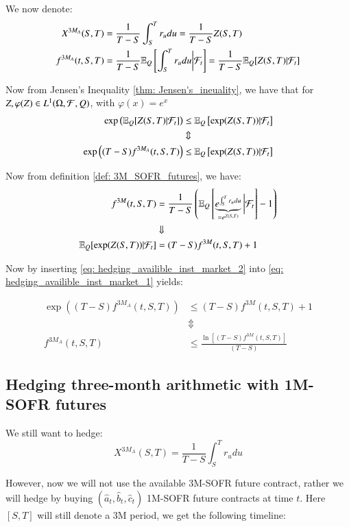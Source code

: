 We now denote: 
\begin{align*}
X^{3M_{A}}(S,T) &= \frac{1}{T-S}\int_{S}^{T}r_{u}du = \frac{1}{T-S}Z(S,T) \\ 
f^{3M_{A}}(t,S,T) &= \frac{1}{T-S}\mathbb{E}_{Q}\left[
\int_{S}^{T}r_{u}du\bigg{|}\mathcal{F}_{t}
\right] = \frac{1}{T-S}\mathbb{E}_{Q}[Z(S,T)|\mathcal{F}_{t}]
\end{align*}

Now from Jensen's Inequality \ref{thm: Jensen's_ineuality}, we have that for $Z, \varphi(Z) \in L^{1}(\Omega, \mathcal{F}, Q)$, with $\varphi(x) = e^{x}$
\begin{align}
\label{eq: hedging_availible_inst_market_1}
\exp\left(
\mathbb{E}_{Q}[Z(S,T)|\mathcal{F}_{t}]
\right)
&\leq 
\mathbb{E}_{Q}\left[
\exp(Z(S,T))|\mathcal{F}_{t}
\right] \nonumber \\ 
&\Updownarrow \nonumber \\ 
\exp\left(
(T-S)f^{3M_{A}}(t,S,T)
\right) 
&\leq 
\mathbb{E}_{Q}\left[\exp(Z(S,T))|\mathcal{F}_{t}\right]
\end{align} 

Now from definition \ref{def: 3M_SOFR_futures}, we have: 
\begin{align}
\label{eq: hedging_availible_inst_market_2}
f^{3M}(t,S,T) &= \frac{1}{T-S}\left(
\mathbb{E}_{Q}\left[
\underbrace{e^{\int_{S}^{T}r_{u}du}}_{=e^{Z(S,T)}}
\bigg{|}\mathcal{F}_{t}\right] - 1
\right) \nonumber \\ 
&\Downarrow \nonumber \\ 
\mathbb{E}_{Q}[\exp(Z(S,T))|\mathcal{F}_{t}] &= (T-S)f^{3M}(t,S,T) + 1
\end{align}

Now by inserting \ref{eq: hedging_availible_inst_market_2} into \ref{eq: hedging_availible_inst_market_1} yields:

\begin{align*}
\exp\left(
(T-S)f^{3M_{A}}(t,S,T)
\right) 
&\leq 
(T-S)f^{3M}(t,S,T) + 1 \\ 
&\Updownarrow \\
f^{3M_{A}}(t,S,T) &\leq 
\frac{
\ln[(T-S)f^{3M}(t,S,T)]
}{
(T-S)
}
\end{align*}

\newpage 

\subsection{Hedging three-month arithmetic with 1M-SOFR futures}
\label{sec: 3M_A_vs_(a,b,c)_1M_SOFR}
We still want to hedge: 
$$
X^{3M_{A}}(S,T) = \frac{1}{T-S}\int_{S}^{T}r_{u}du
$$

However, now we will not use the available 3M-SOFR future contract, rather we will hedge by buying $(\hat{a}_{t}, \hat{b}_{t}, \hat{c}_{t})$ 1M-SOFR future contracts at time $t$. Here $[S,T]$ will still denote a 3M period, we get the following timeline:


